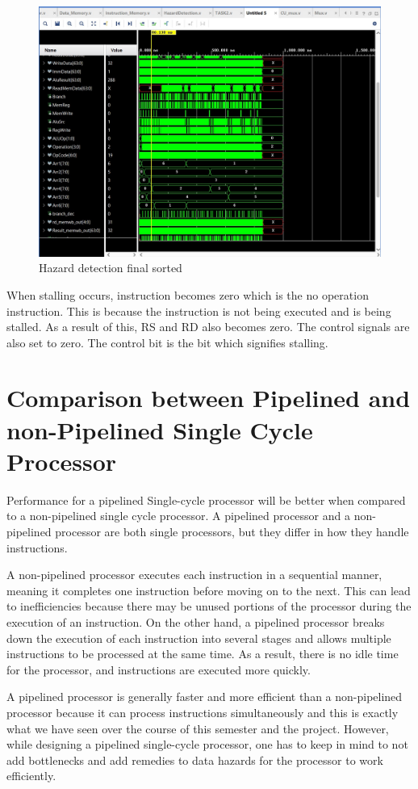 \documentclass{article}
\begin{document}
\begin{figure}[!h]
    \centering
    \includegraphics*[width = 9 cm]{hazarddetectionfinalsorted.jpeg}
    \caption{Hazard detection final sorted}
    \label{fig:label5}
\end{figure}

When stalling occurs, instruction becomes zero which is the no operation instruction. This is because the instruction is not being executed and is being stalled. As a result of this, RS and RD also becomes zero. The control signals are also set to zero. The control bit is the bit which signifies stalling.

\section{Comparison between Pipelined and non-Pipelined Single Cycle Processor}

Performance for a pipelined Single-cycle processor will be better when compared to a non-pipelined single cycle processor. A pipelined processor and a non-pipelined processor are both single processors, but they differ in how they handle instructions.

A non-pipelined processor executes each instruction in a sequential manner, meaning it completes one instruction before moving on to the next. This can lead to inefficiencies because there may be unused portions of the processor during the execution of an instruction. On the other hand, a pipelined processor breaks down the execution of each instruction into several stages and allows multiple instructions to be processed at the same time. As a result, there is no idle time for the processor, and instructions are executed more quickly.

A pipelined processor is generally faster and more efficient than a non-pipelined processor because it can process instructions simultaneously and this is exactly what we have seen over the course of this semester and the project. However, while designing a pipelined single-cycle processor, one has to keep in mind to not add bottlenecks and add remedies to data hazards for the processor to work efficiently.
\end{document}
